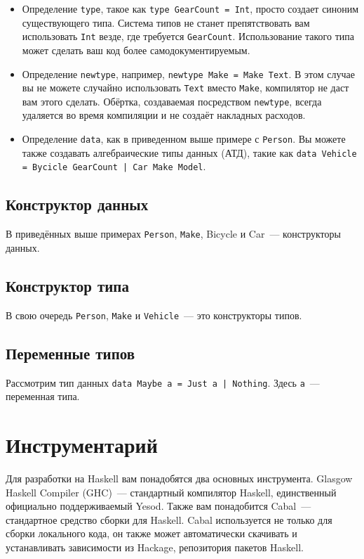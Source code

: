 \begin{itemize}
  \item Определение \lstinline'type', такое как \lstinline'type GearCount = Int', просто создает синоним существующего типа. Система типов не станет препятствовать вам использовать \lstinline'Int' везде, где требуется \lstinline'GearCount'. Использование такого типа может сделать ваш код более самодокументируемым.
  \item Определение \lstinline'newtype', например, \lstinline'newtype Make = Make Text'. В этом случае вы не можете случайно использовать \lstinline'Text' вместо \lstinline'Make', компилятор не даст вам этого сделать. Обёртка, создаваемая посредством \lstinline'newtype', всегда удаляется во время компиляции и не создаёт накладных расходов.
  \item Определение \lstinline'data', как в приведенном выше примере с \lstinline'Person'. Вы можете также создавать алгебраические типы данных (АТД), такие как \lstinline'data Vehicle = Bycicle GearCount | Car Make Model'.
\end{itemize}

\subsection{Конструктор данных}

В приведённых выше примерах \lstinline'Person', \lstinline'Make', Bicycle и Car~--- конструкторы данных.

\subsection{Конструктор типа}

В свою очередь \lstinline'Person', \lstinline'Make' и \lstinline'Vehicle'~--- это конструкторы типов.

\subsection{Переменные типов}

Рассмотрим тип данных \lstinline'data Maybe a = Just a | Nothing'. Здесь \lstinline'a'~--- переменная типа.

\section{Инструментарий}

Для разработки на Haskell вам понадобятся два основных инструмента. Glasgow Haskell Compiler (GHC)~--- стандартный компилятор Haskell, единственный официально поддерживаемый Yesod. Также вам понадобится Cabal~--- стандартное средство сборки для Haskell. Cabal используется не только для сборки локального кода, он также может автоматически скачивать и устанавливать зависимости из Hackage, репозитория пакетов Haskell.

